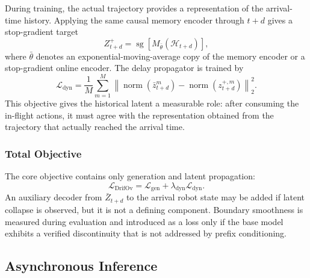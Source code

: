 During training, the actual trajectory provides a representation of the
arrival-time history.  Applying the same causal memory encoder through
\(t+d\) gives a stop-gradient target
\begin{equation}
    Z_{t+d}^{+}
    =
    \operatorname{sg}
    \left[
        M_{\bar\theta}
        \left(
            \mathcal{H}_{t+d}
        \right)
    \right],
    \label{eq:arrival_latent_target}
\end{equation}
where \(\bar\theta\) denotes an exponential-moving-average copy of the memory
encoder or a stop-gradient online encoder.  The delay propagator is trained by
\begin{equation}
    \mathcal{L}_{\mathrm{dyn}}
    =
    \frac{1}{M}
    \sum_{m=1}^{M}
    \left\|
        \operatorname{norm}(\bar z_{t+d}^{m})
        -
        \operatorname{norm}(z_{t+d}^{+,m})
    \right\|_2^2.
    \label{eq:latent_dynamics_loss}
\end{equation}
This objective gives the historical latent a measurable role: after consuming
the in-flight actions, it must agree with the representation obtained from the
trajectory that actually reached the arrival time.

\subsubsection{Total Objective}

The core objective contains only generation and latent propagation:
\begin{equation}
    \mathcal{L}_{\mathrm{DrifOv}}
    =
    \mathcal{L}_{\mathrm{gen}}
    +
    \lambda_{\mathrm{dyn}}
    \mathcal{L}_{\mathrm{dyn}}.
    \label{eq:drifov_total}
\end{equation}
An auxiliary decoder from \(\bar Z_{t+d}\) to the arrival robot state may be
added if latent collapse is observed, but it is not a defining component.
Boundary smoothness is measured during evaluation and introduced as a loss
only if the base model exhibits a verified discontinuity that is not addressed
by prefix conditioning.

\subsection{Asynchronous Inference}

